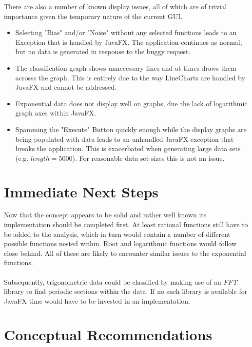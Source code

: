 \documentclass[main.tex]{subfiles}
\begin{document}
    
    
    There are also a number of known display issues, all of which are of trivial importance given the temporary nature of the current GUI.
    \begin{itemize}
      \item Selecting "Bias" and/or "Noise" without any selected functions leads to an Exception that is handled by JavaFX. The application continues as normal, but no data is generated in response to the buggy request.
      \item The classification graph shows unnecessary lines and at times draws them acrosss the graph. This is entirely due to the way LineCharts are handled by JavaFX and cannot be addressed.
      \item Exponential data does not display well on graphs, due the lack of logarithmic graph axes within JavaFX.
      \item Spamming the "Execute" Button quickly enough while the display graphs are being populated with data leads to an unhandled JavaFX exception that breaks the application. This is exacerbated when generating large data sets (e.g. $length=5000$). For reasonable data set sizes this is not an issue.
    \end{itemize}
    
  \section{Immediate Next Steps}
    
    Now that the concept appears to be solid and rather well known its implementation should be completed first. At least rational functions still have to be added to the analysis, which in turn would contain a number of different possible functions nested within. Root and logarithmic functions would follow close behind. All of these are likely to encounter similar issues to the exponential functions.
    \\\\
    Subsequently, trigonometric data could be classified by making use of an \textit{FFT} library to find periodic sections within the data. If no such library is available for JavaFX time would have to be invested in an implementation.
        
  \section{Conceptual Recommendations}
    
\end{document}
